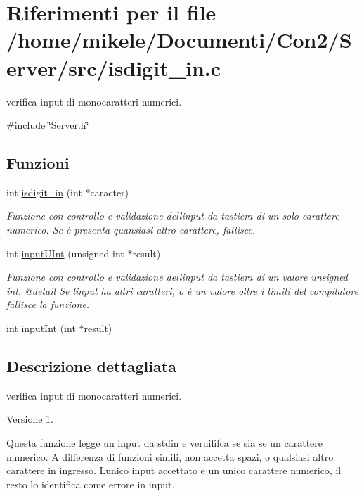 \hypertarget{a00023}{}\section{Riferimenti per il file /home/mikele/\+Documenti/\+Con2/\+Server/src/isdigit\+\_\+in.c}
\label{a00023}


verifica input di monocaratteri numerici.  


{\ttfamily \#include \char`\"{}Server.\+h\char`\"{}}\newline
\subsection*{Funzioni}
\begin{DoxyCompactItemize}
\item 
int \mbox{\hyperlink{a00023_a0447d21c2e258f94e73a2df7cc5deeb3}{isdigit\+\_\+in}} (int $\ast$caracter)
\begin{DoxyCompactList}\small\item\em Funzione con controllo e validazione dell\textquotesingle{}input da tastiera di un solo carattere numerico. Se è presenta quansiasi altro carattere, fallisce. \end{DoxyCompactList}\item 
int \mbox{\hyperlink{a00023_ac8639575e0352679109d50fdf1d8a09b}{input\+U\+Int}} (unsigned int $\ast$result)
\begin{DoxyCompactList}\small\item\em Funzione con controllo e validazione dell\textquotesingle{}input da tastiera di un valore unsigned int. @detail Se l\textquotesingle{}input ha altri caratteri, o è un valore oltre i limiti del compilatore fallisce la funzione. \end{DoxyCompactList}\item 
int \mbox{\hyperlink{a00023_adf6dc76d411ca0f1202098a0a3aa2049}{input\+Int}} (int $\ast$result)
\end{DoxyCompactItemize}


\subsection{Descrizione dettagliata}
verifica input di monocaratteri numerici. 

\begin{DoxyVersion}{Versione}
1.
\end{DoxyVersion}
Questa funzione legge un input da stdin e veruififca se sia se un carattere numerico. A differenza di funzioni simili, non accetta spazi, o qualsiasi altro carattere in ingresso. L\textquotesingle{}unico input accettato e\textquotesingle{} un unico carattere numerico, il resto lo identifica come errore in input.


